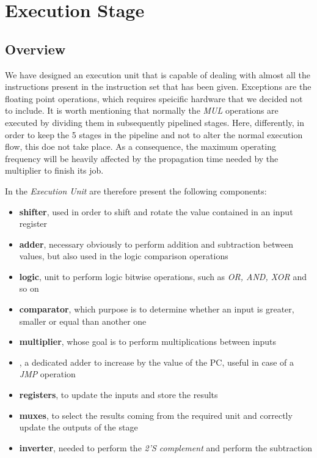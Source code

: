 \chapter{Execution Stage}
\label{chap_exu}

\section{Overview}
We have designed an execution unit that is capable of dealing with almost all the instructions present in the instruction set that has been given. Exceptions are the floating point operations, which requires speicific hardware that we decided not to include. It is worth mentioning that normally the \textit{MUL} operations are executed by dividing them in subsequently pipelined stages. Here, differently, in order to keep the 5 stages in the pipeline and not to alter the normal execution flow, this doe not take place. As a consequence, the maximum operating frequency will be heavily affected by the propagation time needed by the multiplier to finish its job.


In the \textit{Execution Unit} are therefore present the following components:
\begin{itemize}
	\item \textbf{shifter}, used in order to shift and rotate the value contained in an input register
	\item \textbf{adder}, necessary obviously to perform addition and subtraction between values, but also used in the logic comparison operations
	\item \textbf{logic}, unit to perform logic bitwise operations, such as \textit{OR, AND, XOR} and so on
	\item \textbf{comparator}, which purpose is to determine whether an input is greater, smaller or equal than another one
	\item \textbf{multiplier}, whose goal is to perform multiplications between inputs
	\item {}, a dedicated adder to increase by the value of the PC, useful in case of a \textit{JMP} operation
	\item \textbf{registers}, to update the inputs and store the results
	\item \textbf{muxes}, to select the results coming from the required unit and correctly update the outputs of the stage
	\item \textbf{inverter}, needed to perform the \textit{2'S complement} and perform the subtraction
\end{itemize}


